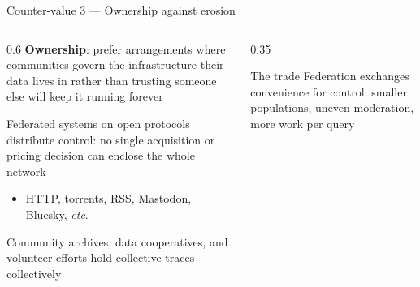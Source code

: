 \documentclass[9pt,aspectratio=169]{beamer}
\begin{document}
\begin{frame}{Counter-value 3 --- Ownership against erosion}
    \begin{columns}[T]
        \begin{column}{0.6\textwidth}
            \textbf{Ownership}: prefer arrangements where communities govern the infrastructure their data lives in rather than trusting someone else will keep it running forever

            \medskip
            
            Federated systems on open protocols distribute control: no single acquisition or pricing decision can enclose the whole network
            \begin{itemize}
                \item HTTP, torrents, RSS, Mastodon, Bluesky, \textit{etc}.
            \end{itemize}

            \medskip
            
            Community archives, data cooperatives, and volunteer efforts hold collective traces collectively
            
        \end{column}
        \begin{column}{0.35\textwidth}
            \begin{alertblock}{The trade}
                \small Federation exchanges convenience for control: smaller populations, uneven moderation, more work per query
            \end{alertblock}
        \end{column}
    \end{columns}
\end{frame}
\end{document}
